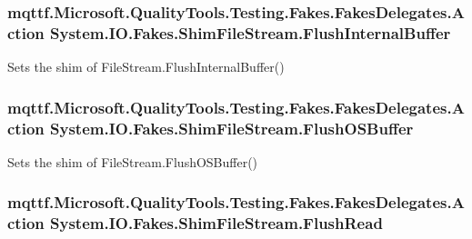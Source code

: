 \hypertarget{class_system_1_1_i_o_1_1_fakes_1_1_shim_file_stream_ac0514df5d13a1f6b52bdcf05e276f611}{
\subsubsection[{Flush\-Internal\-Buffer}]{\setlength{\rightskip}{0pt plus 5cm}mqttf.\-Microsoft.\-Quality\-Tools.\-Testing.\-Fakes.\-Fakes\-Delegates.\-Action System.\-I\-O.\-Fakes.\-Shim\-File\-Stream.\-Flush\-Internal\-Buffer\hspace{0.3cm}{\ttfamily [set]}}}\label{class_system_1_1_i_o_1_1_fakes_1_1_shim_file_stream_ac0514df5d13a1f6b52bdcf05e276f611}


Sets the shim of File\-Stream.\-Flush\-Internal\-Buffer()

\hypertarget{class_system_1_1_i_o_1_1_fakes_1_1_shim_file_stream_a27b3a7c67d4410d815c956183b940d66}{
\subsubsection[{Flush\-O\-S\-Buffer}]{\setlength{\rightskip}{0pt plus 5cm}mqttf.\-Microsoft.\-Quality\-Tools.\-Testing.\-Fakes.\-Fakes\-Delegates.\-Action System.\-I\-O.\-Fakes.\-Shim\-File\-Stream.\-Flush\-O\-S\-Buffer\hspace{0.3cm}{\ttfamily [set]}}}\label{class_system_1_1_i_o_1_1_fakes_1_1_shim_file_stream_a27b3a7c67d4410d815c956183b940d66}


Sets the shim of File\-Stream.\-Flush\-O\-S\-Buffer()

\hypertarget{class_system_1_1_i_o_1_1_fakes_1_1_shim_file_stream_a7be19a1e8bf32e8aa4ba043574138a21}{
\subsubsection[{Flush\-Read}]{\setlength{\rightskip}{0pt plus 5cm}mqttf.\-Microsoft.\-Quality\-Tools.\-Testing.\-Fakes.\-Fakes\-Delegates.\-Action System.\-I\-O.\-Fakes.\-Shim\-File\-Stream.\-Flush\-Read\hspace{0.3cm}{\ttfamily [set]}}}\label{class_system_1_1_i_o_1_1_fakes_1_1_shim_file_stream_a7be19a1e8bf32e8aa4ba043574138a21}


